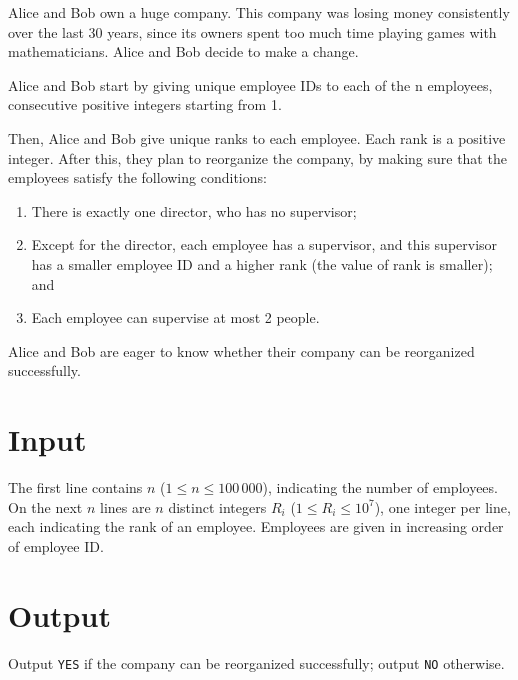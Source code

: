 
Alice and Bob own a huge company. This company was losing money consistently over the last 30 years, since its owners spent too much time playing games with mathematicians. Alice and Bob decide to make a change.

Alice and Bob start by giving unique employee IDs to each of the n employees, consecutive positive integers starting from 1.

Then, Alice and Bob give unique ranks to each employee. Each rank is a positive integer. After this, they plan to reorganize the company, by making sure that the employees satisfy the following conditions:

\begin{enumerate}
    \item There is exactly one director, who has no supervisor;
    \item Except for the director, each employee has a supervisor, and this supervisor has a smaller employee ID and a higher rank (the value of rank is smaller); and
    \item Each employee can supervise at most 2 people.
\end{enumerate}

Alice and Bob are eager to know whether their company can be reorganized successfully.

\section*{Input}
The first line contains $n$ ($1 \leq n \leq 100\,000$), indicating the number of employees. On the next $n$ lines are $n$ distinct integers $R_i$ ($1 \leq R_i \leq 10^7$), one integer per line, each indicating the rank of an employee. Employees are given in increasing order of employee ID.

\section*{Output}
Output \texttt{YES} if the company can be reorganized successfully; output \texttt{NO} otherwise.

